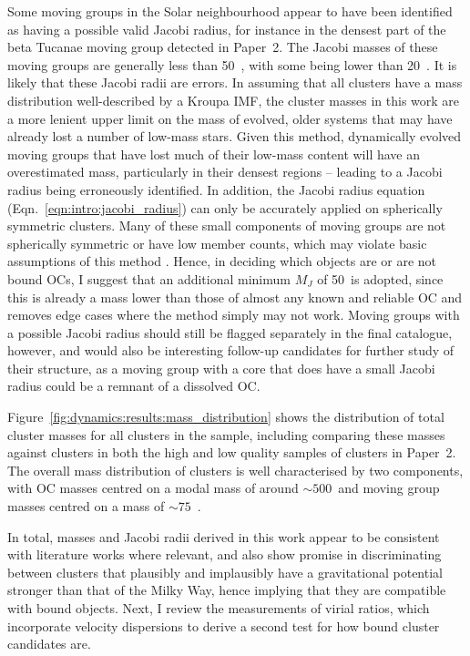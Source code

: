 Some moving groups in the Solar neighbourhood appear to have been identified as having a possible valid Jacobi radius, for instance in the densest part of the beta Tucanae moving group detected in Paper~2. The Jacobi masses of these moving groups are generally less than 50~\MSun, with some being lower than 20~\MSun. It is likely that these Jacobi radii are errors. In assuming that all clusters have a mass distribution well-described by a Kroupa IMF, the cluster masses in this work are a more lenient upper limit on the mass of evolved, older systems that may have already lost a number of low-mass stars. Given this method, dynamically evolved moving groups that have lost much of their low-mass content will have an overestimated mass, particularly in their densest regions -- leading to a Jacobi radius being erroneously identified. In addition, the Jacobi radius equation (Eqn.~\ref{eqn:intro:jacobi_radius}) can only be accurately applied on spherically symmetric clusters. Many of these small components of moving groups are not spherically symmetric or have low member counts, which may violate basic assumptions of this method \citep{binney_galactic_1987}. Hence, in deciding which objects are or are not bound OCs, I suggest that an additional minimum $M_J$ of 50~\MSun is adopted, since this is already a mass lower than those of almost any known and reliable OC and removes edge cases where the method simply may not work. Moving groups with a possible Jacobi radius should still be flagged separately in the final catalogue, however, and would also be interesting follow-up candidates for further study of their structure, as a moving group with a core that does have a small Jacobi radius could be a remnant of a dissolved OC.

Figure~\ref{fig:dynamics:results:mass_distribution} shows the distribution of total cluster masses for all clusters in the sample, including comparing these masses against clusters in both the high and low quality samples of clusters in Paper~2. The overall mass distribution of clusters is well characterised by two components, with OC masses centred on a modal mass of around $\sim500$~\MSun and moving group masses centred on a mass of $\sim75$~\MSun. 

In total, masses and Jacobi radii derived in this work appear to be consistent with literature works where relevant, and also show promise in discriminating between clusters that plausibly and implausibly have a gravitational potential stronger than that of the Milky Way, hence implying that they are compatible with bound objects. Next, I review the measurements of virial ratios, which incorporate velocity dispersions to derive a second test for how bound cluster candidates are. 


